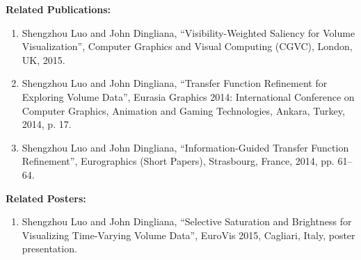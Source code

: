 \documentclass[a4paper, 12pt, oneside]{report}         %
\begin{document}
\begin{thesisabstract}
%
%


\newpage

\textbf{Related Publications:}
\begin{enumerate}
	\item Shengzhou Luo and John Dingliana, ``Visibility-Weighted Saliency for Volume Visualization'', Computer Graphics and Visual Computing (CGVC), London, UK, 2015.
	\item Shengzhou Luo and John Dingliana, ``Transfer Function Refinement for Exploring Volume Data'', Eurasia Graphics 2014: International Conference on Computer Graphics, Animation and Gaming Technologies, Ankara, Turkey, 2014, p. 17.
	\item Shengzhou Luo and John Dingliana, ``Information-Guided Transfer Function Refinement'', Eurographics (Short Papers), Strasbourg, France, 2014, pp. 61--64.
\end{enumerate}

\textbf{Related Posters:}
\begin{enumerate}
	\item Shengzhou Luo and John Dingliana, ``Selective Saturation and Brightness for Visualizing Time-Varying Volume Data'', EuroVis 2015, Cagliari, Italy, poster presentation.
\end{enumerate}

\end{thesisabstract}
\end{document}
